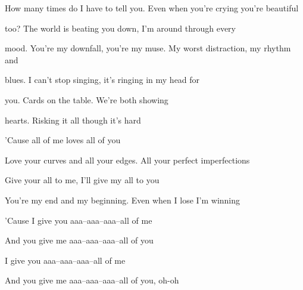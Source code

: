 \begin{song}
\bigskip

 How many times do I have to tell you. Even when you're crying you're beautiful \par
{}too? The world is beating you down, I'm around through every \par
{}mood. You're my downfall, you're my muse. My worst distraction, my rhythm and  \par
{}blues. I can't stop singing, it's ringing in my head for \par

\bigskip

you. Cards on the table. We're both showing \par
{}hearts. Risking it all though it's hard \par

\bigskip

'Cause all of me loves all of you \par
Love your curves and all your edges. All your perfect imperfections \par
Give your all to me, I'll give my all to you \par
You're my end and my beginning. Even when I lose I'm winning \par
'Cause I give you aaa–aaa–aaa–all of me   \par
And you give me aaa–aaa–aaa–all of you  \par

\bigskip

I give you aaa–aaa–aaa–all of me   \par
And you give me aaa–aaa–aaa–all of you, oh-oh \par

\end{song}
